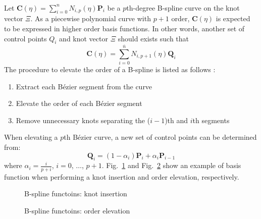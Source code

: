 \paragraph{}
Let $
\mathbf{C}(\eta) =  \sum_{i=0}^n
                    N_{i,p}(\eta)
                    \mathbf{P}_i
$
be a $p$th-degree B-spline curve on the knot vector $\Xi$.
As a piecewise polynomial curve with $p+1$ order, $\mathbf{C}(\eta)$ is expected to be expressed in higher order basis functions.
In other words, another set of control points $Q_i$ and knot vector $\Xi$ should exists such that
\begin{equation}
    \mathbf{C}(\eta) =  \sum_{i=0}^{\overline{n}}
                        N_{i, p+1}(\eta)
                        \mathbf{Q}_i
\end{equation}
The procedure to elevate the order of a B-spline is listed as follows \citep{Pie1997}:
\begin{enumerate}
    \item Extract each Bézier segment from the curve
    \item Elevate the order of each Bézier segment
    \item Remove unnecessary knots separating the ($i-1$)th and $i$th segments
\end{enumerate}
When elevating a $p$th Bézier curve, a new set of control points can be determined from:
\begin{equation}
    \mathbf{Q}_i =  (1-\alpha_i) \mathbf{P}_i +
                    \alpha_i \mathbf{P}_{i-1}
\end{equation}
where $\alpha_i=\frac{i}{p+i}$, $i=0$, $\dots$, $p+1$.
Fig.~\ref{lr_fig:nurbs_knotins} and Fig.~\ref{lr_fig:nurbs_orderele} show an example of basis function when performing a knot insertion and order elevation, respectively.

\begin{figure}[h!]
    \centering
    
    \caption{B-spline functoins: knot insertion}
    \label{lr_fig:nurbs_knotins}
\end{figure}

\begin{figure}[h!]
    \centering
    
    \caption{B-spline functoins: order elevation}
    \label{lr_fig:nurbs_orderele}
\end{figure}

